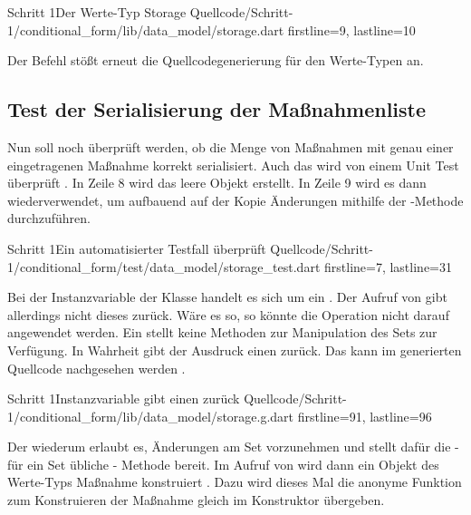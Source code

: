 \begin{alexlisting}{Schritt 1}{Der Werte-Typ Storage}
  {Quellcode/Schritt-1/conditional_form/lib/data_model/storage.dart}
  {firstline=9, lastline=10}
  \label{lst:Schritt1WerteTypStorage}
\end{alexlisting}

Der Befehl   stößt erneut die Quellcodegenerierung für den Werte-Typen  an.

\subsection{Test der Serialisierung der Maßnahmenliste}

Nun soll noch überprüft werden, ob die Menge von Maßnahmen mit genau einer eingetragenen Maßnahme korrekt serialisiert.
Auch das wird von einem Unit Test überprüft \Lst{\ref{lst:Schritt1MassnahmenSerialisierenOhneFehlerUnitTest}}.
In Zeile 8 wird das leere Objekt  erstellt.
In Zeile 9 wird es dann wiederverwendet, um aufbauend auf der Kopie Änderungen mithilfe der -Methode durchzuführen.

\begin{alexlisting}{Schritt 1}{Ein automatisierter Testfall überprüft}
  {Quellcode/Schritt-1/conditional_form/test/data_model/storage_test.dart}
  {firstline=7, lastline=31}
  \label{lst:Schritt1MassnahmenSerialisierenOhneFehlerUnitTest}
\end{alexlisting}

Bei der Instanzvariable  der Klasse  handelt es sich um ein .
 Der Aufruf von   gibt allerdings nicht dieses  zurück. Wäre es so, so könnte die Operation  nicht  darauf angewendet werden. Ein  stellt keine Methoden zur Manipulation des Sets zur Verfügung. In Wahrheit gibt der Ausdruck  einen  zurück. Das kann im generierten Quellcode nachgesehen werden \LstZ{\ref{lst:Schritt1InstanzvariableMassnahmenGibtEinenSetBuilderZurueck}}.

\begin{alexlisting}{Schritt 1}{Instanzvariable  gibt einen  zurück}
  {Quellcode/Schritt-1/conditional_form/lib/data_model/storage.g.dart}
  {firstline=91, lastline=96}
  \label{lst:Schritt1InstanzvariableMassnahmenGibtEinenSetBuilderZurueck}
\end{alexlisting}

Der  wiederum erlaubt es, Änderungen am Set vorzunehmen und stellt dafür die - für ein Set übliche - Methode  bereit.
Im Aufruf von  wird dann ein Objekt des Werte-Typs Maßnahme konstruiert .
Dazu wird dieses Mal die anonyme Funktion zum Konstruieren der Maßnahme gleich im Konstruktor übergeben.


